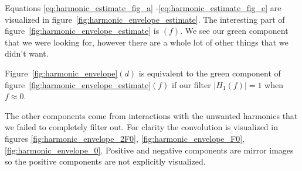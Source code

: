 \documentclass [11pt, proquest] {uwthesis}[2015/03/03]
\begin{document}
Equations \ref{eq:harmonic_estimate_fig_a}  -\ref{eq:harmonic_estimate_fig_e} are visualized in figure~\ref{fig:harmonic_envelope_estimate}. The interesting part of figure~\ref{fig:harmonic_envelope_estimate} is $(f)$.  We see our green component that we were looking for, however there are a whole lot of other things that we didn't want.

Figure~\ref{fig:harmonic_envelope}$(d)$ is equivalent to the green component of  figure~\ref{fig:harmonic_envelope_estimate}$(f)$ if our filter $|H_1(f)| = 1$ when $f \approx 0$.

The other components come from interactions with the unwanted harmonics that we failed to completely filter out.  For clarity the convolution is visualized in figures \ref{fig:harmonic_envelope_2F0}, \ref{fig:harmonic_envelope_F0}, \ref{fig:harmonic_envelope_0}.  Positive and negative components are mirror images so the positive components are not explicitly visualized.
\end{document}
